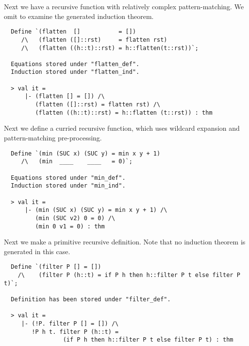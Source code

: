 Next we have a recursive function with relatively complex
pattern-matching. We omit to examine the generated induction
theorem.
%
\begin{hol}
\begin{verbatim}
  Define `(flatten  []           = [])
     /\   (flatten ([]::rst)     = flatten rst)
     /\   (flatten ((h::t)::rst) = h::flatten(t::rst))`;

  Equations stored under "flatten_def".
  Induction stored under "flatten_ind".

  > val it =
      |- (flatten [] = []) /\
         (flatten ([]::rst) = flatten rst) /\
         (flatten ((h::t)::rst) = h::flatten (t::rst)) : thm
\end{verbatim}
\end{hol}

Next we define a curried recursive function, which uses
wildcard expansion and pattern-matching pre-processing.
%
\begin{hol}
\begin{verbatim}
  Define `(min (SUC x) (SUC y) = min x y + 1)
     /\   (min  ____    ____   = 0)`;

  Equations stored under "min_def".
  Induction stored under "min_ind".

  > val it =
      |- (min (SUC x) (SUC y) = min x y + 1) /\
         (min (SUC v2) 0 = 0) /\
         (min 0 v1 = 0) : thm
\end{verbatim}
\end{hol}

 Next we make a primitive recursive definition. Note that no
induction theorem is generated in this case.
%
\begin{hol}
\begin{verbatim}
  Define `(filter P [] = [])
    /\    (filter P (h::t) = if P h then h::filter P t else filter P t)`;

  Definition has been stored under "filter_def".

  > val it =
     |- (!P. filter P [] = []) /\
        !P h t. filter P (h::t) =
                 (if P h then h::filter P t else filter P t) : thm
\end{verbatim}
\end{hol}


